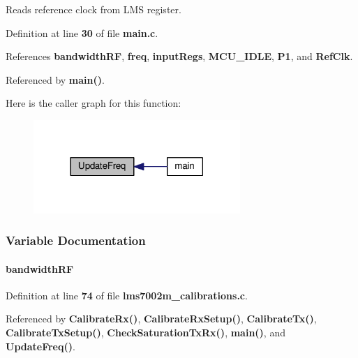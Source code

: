 Reads reference clock from L\+MS register. 



Definition at line {\bf 30} of file {\bf main.\+c}.



References {\bf bandwidth\+RF}, {\bf freq}, {\bf input\+Regs}, {\bf M\+C\+U\+\_\+\+I\+D\+LE}, {\bf P1}, and {\bf Ref\+Clk}.



Referenced by {\bf main()}.



Here is the caller graph for this function\+:
\nopagebreak
\begin{figure}[H]
\begin{center}
\leavevmode
\includegraphics[width=222pt]{d0/d29/main_8c_a5885ccb6b7e7a226a0a29550b9a53daa_icgraph}
\end{center}
\end{figure}




\subsubsection{Variable Documentation}
\paragraph[{bandwidth\+RF}]{ bandwidth\+RF}\label{main_8c_a1970c49a0634e5d470cc13c9220eeb8b}


Definition at line {\bf 74} of file {\bf lms7002m\+\_\+calibrations.\+c}.



Referenced by {\bf Calibrate\+Rx()}, {\bf Calibrate\+Rx\+Setup()}, {\bf Calibrate\+Tx()}, {\bf Calibrate\+Tx\+Setup()}, {\bf Check\+Saturation\+Tx\+Rx()}, {\bf main()}, and {\bf Update\+Freq()}.

